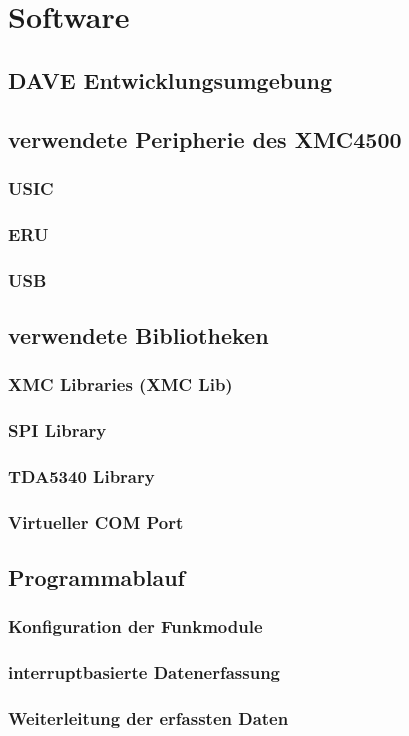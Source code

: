 \chapter{Software}
\label{sec:Software}
\pagestyle{scrheadings}
\section{DAVE Entwicklungsumgebung}
\section{verwendete Peripherie des XMC4500}
\subsection{USIC}
\subsection{ERU}
\subsection{USB}
\section{verwendete Bibliotheken}
\subsection{XMC Libraries (XMC Lib)}
\subsection{SPI Library}
\subsection{TDA5340 Library}
\subsection{Virtueller COM Port}
\section{Programmablauf}
\subsection{Konfiguration der Funkmodule}
\subsection{interruptbasierte Datenerfassung}
\subsection{Weiterleitung der erfassten Daten}
